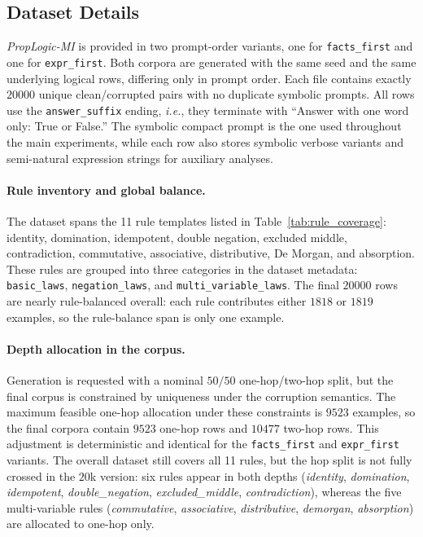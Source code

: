 \documentclass[11pt]{article}
\begin{document}
\subsection{Dataset Details}
\label{sec:appendix_dataset}

\textit{PropLogic-MI} is provided in two prompt-order variants, one for \texttt{facts\_first} and one for \texttt{expr\_first}. Both corpora are generated with the same seed and the same underlying logical rows, differing only in prompt order. Each file contains exactly $20000$ unique clean/corrupted pairs with no duplicate symbolic prompts. All rows use the \texttt{answer\_suffix} ending, \textit{i.e.}, they terminate with ``Answer with one word only: True or False.'' The symbolic compact prompt is the one used throughout the main experiments, while each row also stores symbolic verbose variants and semi-natural expression strings for auxiliary analyses.

\paragraph{Rule inventory and global balance.}
The dataset spans the 11 rule templates listed in Table~\ref{tab:rule_coverage}: identity, domination, idempotent, double negation, excluded middle, contradiction, commutative, associative, distributive, De Morgan, and absorption. These rules are grouped into three categories in the dataset metadata: \texttt{basic\_laws}, \texttt{negation\_laws}, and \texttt{multi\_variable\_laws}. The final $20000$ rows are nearly rule-balanced overall: each rule contributes either $1818$ or $1819$ examples, so the rule-balance span is only one example.

\paragraph{Depth allocation in the corpus.}
Generation is requested with a nominal $50/50$ one-hop/two-hop split, but the final corpus is constrained by uniqueness under the corruption semantics. The maximum feasible one-hop allocation under these constraints is $9523$ examples, so the final corpora contain $9523$ one-hop rows and $10477$ two-hop rows. This adjustment is deterministic and identical for the \texttt{facts\_first} and \texttt{expr\_first} variants. The overall dataset still covers all 11 rules, but the hop split is not fully crossed in the $20$k version: six rules appear in both depths (\textit{identity}, \textit{domination}, \textit{idempotent}, \textit{double\_negation}, \textit{excluded\_middle}, \textit{contradiction}), whereas the five multi-variable rules (\textit{commutative}, \textit{associative}, \textit{distributive}, \textit{demorgan}, \textit{absorption}) are allocated to one-hop only.
\end{document}
